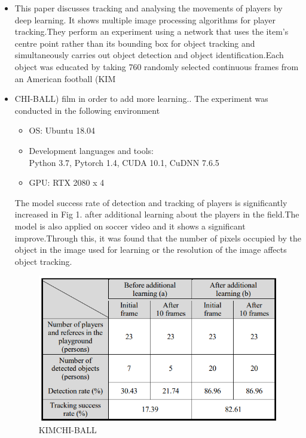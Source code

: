 \documentclass[12pt]{article}
\begin{document}
\begin{itemize}
       \item 
       This paper \cite{9289223} discusses tracking and analysing the movements of players by deep learning. It shows multiple image processing algorithms for player tracking.They perform an experiment using a network that uses the item's centre point rather than its bounding box for object tracking and simultaneously carries out object detection and object identification.Each object was educated by taking 760 randomly selected continuous frames from an American football (KIM
       \item CHI-BALL) film in order to add more learning.. 
        The experiment was conducted in the following environment
        \begin{itemize}
             \item OS: Ubuntu 18.04
             \item Development languages and tools:\\
             Python 3.7, Pytorch 1.4, CUDA 10.1, CuDNN 7.6.5
             \item GPU: RTX 2080 x 4 
        \end{itemize}
        The model success rate of detection and tracking of players is 
        significantly increased in Fig 1. after additional learning about the 
        players in the field.The model is also applied on soccer video and it shows a significant improve.Through this, it was found that the number of pixels occupied 
        by the object in the image used for learning or the resolution 
        of the image affects object tracking.
        \begin{figure}[H]
            \centering
            \includegraphics{figures/Screenshot 2023-11-11 193421.png}
            \caption{KIMCHI-BALL}
            \label{fig:KIMCHI-BALL Output}
        \end{figure}


\end{itemize}
\end{document}
